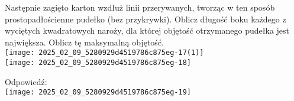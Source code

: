 \documentclass[10pt]{article}
\begin{document}
Następnie zagięto karton wzdłuż linii przerywanych, tworząc w ten sposób prostopadłościenne pudełko (bez przykrywki). Oblicz długość boku każdego z wyciętych kwadratowych naroży, dla której objętość otrzymanego pudełka jest największa. Oblicz tę maksymalną objętość.\\
\texttt{[image: 2025\_02\_09\_5280929d4519786c875eg-17(1)]}\\
\texttt{[image: 2025\_02\_09\_5280929d4519786c875eg-18]}

Odpowiedź:\\
\texttt{[image: 2025\_02\_09\_5280929d4519786c875eg-19]}
\end{document}
